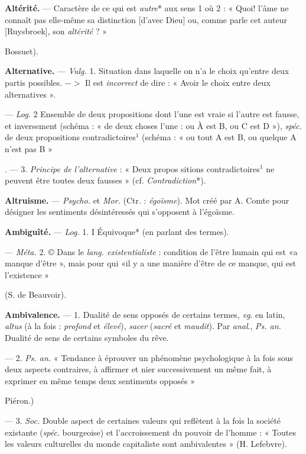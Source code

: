 \begin{itemize}[leftmargin=1cm, label=, itemsep=1pt]
{{\item {\bf Altérité.} — Caractère de ce qui est
{\it autre}* aux sens 1 où 2 : « Quoi!
l'âme ne connaît pas elle-même sa
distinction [d'avec Dieu] ou, comme
parle cet auteur [Ruysbroek], son
{\it altérité} ? » {Bossuet).

\item {\bf Alternative.} — \textsf{\textit {Vulg.}} 1. Situation
dans laquelle on n’a le choix qu'entre
deux partis possibles. $->$ Il est
{\it incorrect} de dire : « Avoir le choix
entre deux alternatives ».

— \textsf{\textit {Log.}} 2 Ensemble de deux
propositions dont l’une est vraie si
l’autre est fausse, et inversement
(schéma : « de deux choses l’une :
ou À est B, ou C est D »), {\it spéc}. de
deux propositions contradictoires$^1$
(schéma : « ou tout A est B, ou
quelque A n’est pas B »}. — 3. {\it Principe de l'alternative} : « Deux propos
sitions contradictoires$^1$ ne peuvent
être toutes deux fausses » (cf. {\it Contradiction}*).

\item {\bf Altruisme.} — \textsf{\textit {Psycho.}} et \textsf{\textit {Mor.}} (Ctr. :
{\it égoïsme}). Mot créé par A. Comte
pour désigner les sentiments désintéressés qui s'opposent à l’égoïsme.

\item {\bf Ambiguîté.} — \textsf{\textit {Log.}} 1. I Équivoque* (en
parlant des termes).

— \textsf{\textit {Méta.}} 2. © Dans le {\it lang. existentialiste} : condition de l'être humain
qui est «a manque d’être », mais pour
qui «il y a une manière d’être de
ce manque, qui est l'existence »
{(S. de Beauvoir).

\item {\bf Ambivalence.} — 1. Dualité de sens
opposés de certains termes, {\it vg}. en
latin, {\it altus} (à la fois : {\it profond} et
{\it élevé}), {\it sacer} ({\it sacré} et {\it maudit}). Par
{\it anal}., \textsf{\textit {Ps. an.}} Dualité de sens de
certains symboles du rêve.

— 2. \textsf{\textit {Ps. an.}} « Tendance à
éprouver un phénomène psychologique à la fois sous deux aspects
contraires, à affirmer et nier successivement un même fait, à exprimer en
même temps deux sentiments opposés » {Piéron.)

— 3. \textsf{\textit {Soc.}} Double aspect de
certaines valeurs qui reflètent à la
fois la société existante ({\it spéc}. bourgeoise) et l’accroissement du pouvoir
de l’homme : « Toutes les valeurs
culturelles du monde capitaliste sont
ambivalentes » (H. Lefebvre).

}}}}
\end{itemize}
